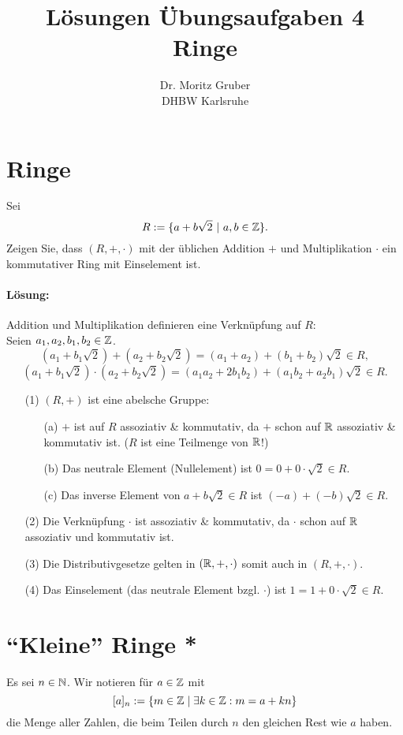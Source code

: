 \documentclass[
				a4paper,
				10pt
			]
			{scrartcl}
\author{Dr. Moritz Gruber\\ DHBW Karlsruhe}
\title{L\"osungen \"Ubungsaufgaben 4\\ 
	Ringe
}
\date{}
\begin{document}
\maketitle

\section{Ringe}

Sei
$$
	R := \{ a + b\sqrt{2} ~|~a,b \in \mathbb{Z} \}. 
$$
Zeigen Sie, dass $(R,+,\cdot)$ mit der \"ublichen Addition $+$ und Multiplikation $\cdot$ ein kommutativer Ring mit Einselement ist.


\paragraph{L\"osung:}

Addition und Multiplikation definieren eine Verkn\"upfung auf $R$:\\ 
Seien $a_1,a_2,b_1,b_2 \in \mathbb{Z}$.
$$
	(a_1 + b_1\sqrt{2}) + (a_2 + b_2\sqrt{2}) = (a_1+ a_2) + (b_1+ b_2)\sqrt{2}	\in R,
$$
$$
	(a_1 + b_1\sqrt{2}) \cdot (a_2 + b_2\sqrt{2}) = (a_1a_2 + 2b_1b_2) + (a_1b_2 + a_2b_1)\sqrt{2}	\in R.
$$

\begin{itemize}
	\item[(1)] $(R,+)$ ist eine abelsche Gruppe:
			\begin{itemize}
				\item[(a)] $+$ ist auf $R$ assoziativ \& kommutativ, da $+$ schon auf $\mathbb{R}$ assoziativ \& kommutativ ist.
						($R$ ist eine Teilmenge von $\mathbb{R}$!)
				\item[(b)] Das neutrale Element (Nullelement) ist $0 = 0 + 0\cdot\sqrt{2} \in R$.
				\item[(c)] Das inverse Element von $a + b\sqrt{2} \in R$  ist $(-a) + (-b)\sqrt{2} \in R$.
			\end{itemize}
	\item[(2)] Die Verkn\"upfung $\cdot$ ist assoziativ \& kommutativ, da $\cdot$ schon auf $\mathbb{R}$ assoziativ und kommutativ ist.
	\item[(3)] Die Distributivgesetze gelten in $(\mathbb{R},+,\cdot)$ somit auch in $(R, +, \cdot)$.
	\item[(4)] Das Einselement (das neutrale Element bzgl. $\cdot$) ist $1 = 1 + 0\cdot\sqrt{2} \in R.$
\end{itemize}



\section{``Kleine'' Ringe *}
Es sei $n \in \mathbb{N}$. Wir notieren f\"ur $a \in \mathbb{Z}$ mit
$$
[a]_n:=\{m \in \mathbb{Z} \mid \exists k\in \mathbb{Z}: m=a+kn\}
$$
die Menge aller Zahlen, die beim Teilen durch $n$ den gleichen Rest wie $a$ haben.
\end{document}
